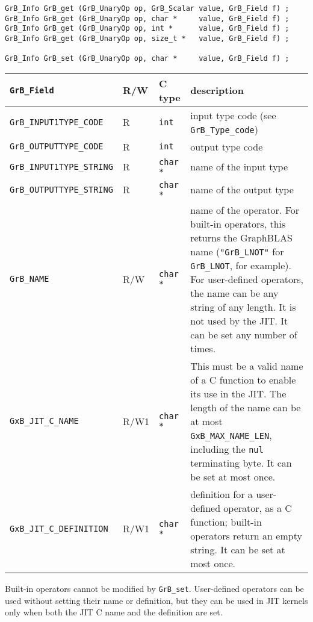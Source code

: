 \begin{mdframed}[userdefinedwidth=6in]
{\footnotesize
\begin{verbatim}
GrB_Info GrB_get (GrB_UnaryOp op, GrB_Scalar value, GrB_Field f) ;
GrB_Info GrB_get (GrB_UnaryOp op, char *     value, GrB_Field f) ;
GrB_Info GrB_get (GrB_UnaryOp op, int *      value, GrB_Field f) ;
GrB_Info GrB_get (GrB_UnaryOp op, size_t *   value, GrB_Field f) ;

GrB_Info GrB_set (GrB_UnaryOp op, char *     value, GrB_Field f) ;
\end{verbatim}
}\end{mdframed}

\noindent
{\small
\begin{tabular}{|l|l|l|p{2.8in}|}
\hline
\verb'GrB_Field'                    & R/W  & C type        & description \\
\hline
\verb'GrB_INPUT1TYPE_CODE'          & R    & \verb'int'    & input type code (see \verb'GrB_Type_code') \\
\verb'GrB_OUTPUTTYPE_CODE'          & R    & \verb'int'    & output type code \\
\verb'GrB_INPUT1TYPE_STRING'        & R    & \verb'char *' & name of the input type \\
\verb'GrB_OUTPUTTYPE_STRING'        & R    & \verb'char *' & name of the output type \\
\hline
\verb'GrB_NAME'                     & R/W  & \verb'char *' &
    name of the operator.  For built-in operators, this returns the GraphBLAS
    name (\verb'"GrB_LNOT"' for \verb'GrB_LNOT', for example).
    For user-defined operators, the name can be any string of any length.  It
    is not used by the JIT.  It can be set any number of times. \\
\verb'GxB_JIT_C_NAME'               & R/W1 & \verb'char *' &
    This must be a valid name of a C function to enable its use in the JIT.
    The length of the name can be at most \verb'GxB_MAX_NAME_LEN', including
    the \verb'nul' terminating byte.  It can be set at most once. \\
\verb'GxB_JIT_C_DEFINITION'         & R/W1 & \verb'char *' &
    definition for a user-defined operator, as a C function; built-in operators
    return an empty string.  It can be set at most once. \\
\hline
\end{tabular}
}

Built-in operators cannot be modified by \verb'GrB_set'.  User-defined
operators can be used without setting their name or definition, but they can be
used in JIT kernels only when both the JIT C name and the definition are set.


